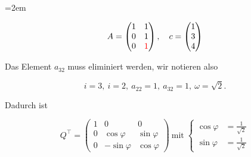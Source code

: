 \begin{solution}    

    \vspace{1\baselineskip}

    \leftskip=2em

    \begin{equation*}
        A = \begin{pmatrix}
            1 & 1\\
            0 & 1\\
            0 & \textcolor{red}{1}
        \end{pmatrix}, \quad
        c = \begin{pmatrix}
            1\\
            3\\
            4
        \end{pmatrix}
    \end{equation*}

    \vspace{1\baselineskip}

    Das Element \( a_{32} \) muss eliminiert werden, wir notieren also
    
    \begin{equation*}
        i = 3, \ i = 2, \ a_{22} = 1, \ a_{32} = 1, \ \omega = \sqrt{2}. 
    \end{equation*}

    Dadurch ist

    \begin{equation*}
        Q^{\top} = \begin{pmatrix}
            1 & 0 & 0\\
            0 & \cos \varphi & \sin \varphi\\
            0 & -\sin \varphi & \cos \varphi
        \end{pmatrix} \ \text{mit} \; \left\{ \begin{aligned}
            \cos \varphi &= \frac{1}{\sqrt{2}}\\
            \sin \varphi &= \frac{1}{\sqrt{2}}
        \end{aligned} \right.
    \end{equation*}

    \vspace{1\baselineskip}


\end{solution}
